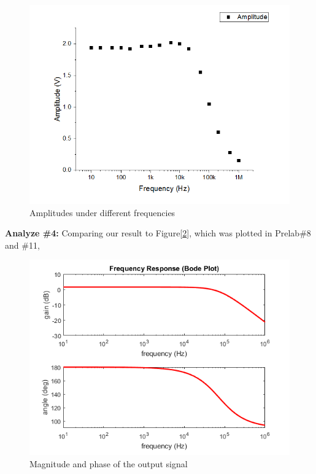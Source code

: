 \begin{figure}[!htbp]
	\centering 
	\begin{framed}
		\includegraphics[width=\linewidth]{images/amp_freq.PNG} 
		\caption{Amplitudes under different frequencies}
		\label{fig:afreq} 
	\end{framed}
\end{figure} 

\textbf{Analyze \#4:} \newline
\phantom{ } Comparing our result to Figure[\ref{fig:pre8}], which was plotted in Prelab\#8 and \#11, 
\begin{figure}[!htbp]
	\centering 
	\begin{framed}
		\includegraphics[width=\linewidth]{prelab/images/9_1.PNG} 
		\caption{Magnitude and phase of the output signal}
		\label{fig:pre8} 
	\end{framed}
\end{figure} 